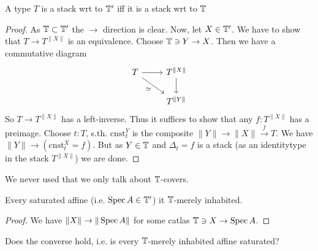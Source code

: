 \begin{lemma}
	A type $T$ is a stack wrt to $\mathbb{T}'$ iff it is a stack wrt to $\mathbb{T}$
\end{lemma}
\begin{proof}
	As $\mathbb{T} \subset \mathbb{T}'$ the $\rightarrow$ direction is clear. Now, let $X \in \mathbb{T}'$. We have to show that $T \to T^{\|X\|}$ is an equivalence. Choose $\mathbb{T} \ni Y \to X$. Then we have a commutative diagram
	\[\begin{tikzcd}
		T & {T^{\|X\|}} \\
		& {T^{\|Y\|}}
		\arrow[from=1-1, to=1-2]
		\arrow["\simeq"', from=1-1, to=2-2]
		\arrow[from=1-2, to=2-2]
	\end{tikzcd}\]
	So $T \to T^{\|X\|}$ has a left-inverse. Thus it suffices to show that any $f : T^{\|X\|}$ has a preimage. Choose $t : T$, s.th. $\mathrm{cnst}^Y_t$ is the composite $\|Y\| \to \|X\| \overset{f}{\to} T$. We have $\|Y\| \to (\mathrm{cnst}^X_t = f)$. But as $Y \in \mathbb{T}$ and $\Delta_t = f$ is a stack (as an identitytype in the stack $T^{\|X\|}$) we are done.
\end{proof}
\begin{rmk}
	We never used that we only talk about $\mathbb{T}$-covers.
\end{rmk}
\begin{lemma}
	Every saturated affine (i.e. $\operatorname{Spec} A \in \mathbb{T}'$) it $\mathbb{T}$-merely inhabited.     
\end{lemma}
\begin{proof}
	We have $\|X\| \to \|\operatorname{Spec} A\|$ for some catlas $\mathbb{T} \ni X \to \operatorname{Spec} A$.
\end{proof}

\begin{question}
	Does the converse hold, i.e. is every $\mathbb{T}$-merely inhabited affine saturated?    
\end{question}

